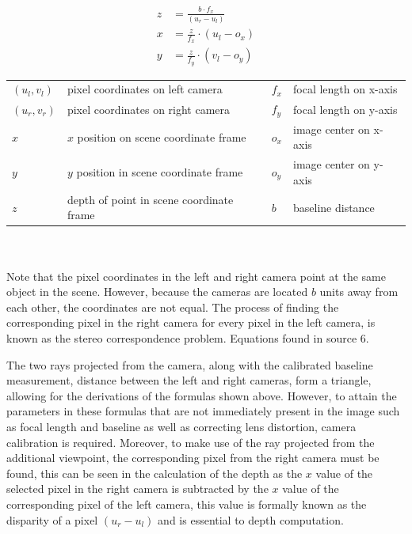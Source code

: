 \documentclass[11pt]{scrartcl}
\begin{document}
\begin{theorem}

  \begin{align}
    z & = \displaystyle\frac{b\cdot f_x}{(u_r-u_l)} \\
    x & = \displaystyle\frac{z}{f_x} \cdot (u_l - o_x) \\
    y & = \displaystyle\frac{z}{f_y} \cdot (v_l - o_y) 
  \end{align}

  \begin{figurekey}
    \begin{tabular}{llll}
      $(u_l,v_l)$ & pixel coordinates on left camera     & $f_x$ & focal length on x-axis \\
      $(u_r,v_r)$ & pixel coordinates on right camera   & $f_y$ & focal length on y-axis \\
      $x$     & $x$ position on scene coordinate frame  & $o_x$ & image center on x-axis \\
      $y$     & $y$ position in scene coordinate frame   & $o_y$ & image center on y-axis \\
        $z$     & depth of point in scene coordinate frame  &$b$ & baseline distance \\
    \end{tabular}
  \end{figurekey} \\ \\
    Note that the pixel coordinates in the left and right camera point at the same object in 
    the scene. However, because the cameras are located $b$ units away from each other, 
    the coordinates are not equal. The process of finding the corresponding pixel in the 
    right camera for every pixel in the left camera, is known as the stereo correspondence 
    problem. Equations found in source 6. 
\end{theorem}

The two rays projected from the camera, along with the calibrated baseline measurement, distance between the left and right cameras, form a triangle, allowing for the derivations of the formulas
shown above. However, to attain the parameters in these formulas that are not immediately present in the image such as focal length and baseline as well as correcting lens distortion, camera calibration is required. Moreover, to make use of the ray projected from the additional viewpoint, the corresponding pixel from the right camera must be 
found, this can be seen in the calculation of the depth as the $x$ value of the selected pixel in the right camera is subtracted by the $x$ value of the corresponding pixel of the left camera, this value is formally known as the disparity of a pixel $(u_r-u_l)$ and is essential to depth computation. 
\end{document}

